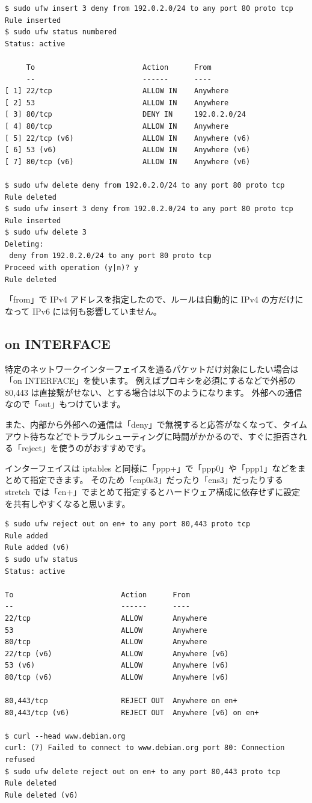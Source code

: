 \documentclass[mingoth,a4paper]{jsarticle}
\begin{document}
\begin{verbatim}
$ sudo ufw insert 3 deny from 192.0.2.0/24 to any port 80 proto tcp
Rule inserted
$ sudo ufw status numbered
Status: active

     To                         Action      From
     --                         ------      ----
[ 1] 22/tcp                     ALLOW IN    Anywhere
[ 2] 53                         ALLOW IN    Anywhere
[ 3] 80/tcp                     DENY IN     192.0.2.0/24
[ 4] 80/tcp                     ALLOW IN    Anywhere
[ 5] 22/tcp (v6)                ALLOW IN    Anywhere (v6)
[ 6] 53 (v6)                    ALLOW IN    Anywhere (v6)
[ 7] 80/tcp (v6)                ALLOW IN    Anywhere (v6)

$ sudo ufw delete deny from 192.0.2.0/24 to any port 80 proto tcp
Rule deleted
$ sudo ufw insert 3 deny from 192.0.2.0/24 to any port 80 proto tcp
Rule inserted
$ sudo ufw delete 3
Deleting:
 deny from 192.0.2.0/24 to any port 80 proto tcp
Proceed with operation (y|n)? y
Rule deleted
\end{verbatim}

「from」で IPv4 アドレスを指定したので、ルールは自動的に IPv4 の方だけになって IPv6 には何も影響していません。

\subsection{on INTERFACE}

特定のネットワークインターフェイスを通るパケットだけ対象にしたい場合は「on INTERFACE」を使います。
例えばプロキシを必須にするなどで外部の 80,443 は直接繋がせない、とする場合は以下のようになります。
外部への通信なので「out」もつけています。

また、内部から外部への通信は「deny」で無視すると応答がなくなって、タイムアウト待ちなどでトラブルシューティングに時間がかかるので、すぐに拒否される「reject」を使うのがおすすめです。

インターフェイスは iptables と同様に「ppp+」で「ppp0」や「ppp1」などをまとめて指定できます。
そのため「enp0s3」だったり「ens3」だったりする stretch では「en+」でまとめて指定するとハードウェア構成に依存せずに設定を共有しやすくなると思います。

\begin{verbatim}
$ sudo ufw reject out on en+ to any port 80,443 proto tcp
Rule added
Rule added (v6)
$ sudo ufw status
Status: active

To                         Action      From
--                         ------      ----
22/tcp                     ALLOW       Anywhere
53                         ALLOW       Anywhere
80/tcp                     ALLOW       Anywhere
22/tcp (v6)                ALLOW       Anywhere (v6)
53 (v6)                    ALLOW       Anywhere (v6)
80/tcp (v6)                ALLOW       Anywhere (v6)

80,443/tcp                 REJECT OUT  Anywhere on en+
80,443/tcp (v6)            REJECT OUT  Anywhere (v6) on en+

$ curl --head www.debian.org
curl: (7) Failed to connect to www.debian.org port 80: Connection refused
$ sudo ufw delete reject out on en+ to any port 80,443 proto tcp
Rule deleted
Rule deleted (v6)
\end{verbatim}
\end{document}

